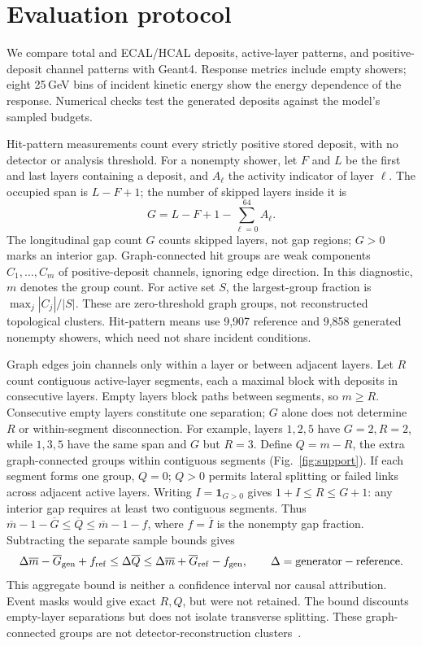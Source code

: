 \documentclass[10pt]{article}
\begin{document}
\section{Evaluation protocol}
\label{sec:diagnostics}

We compare total and ECAL/HCAL deposits, active-layer patterns, and positive-deposit channel patterns with Geant4. Response metrics include empty showers; eight 25\,GeV bins of incident kinetic energy show the energy dependence of the response. Numerical checks test the generated deposits against the model's sampled budgets.

Hit-pattern measurements count every strictly positive stored deposit, with no detector or analysis threshold. For a nonempty shower, let $F$ and $L$ be the first and last layers containing a deposit, and $A_\ell$ the activity indicator of layer $\ell$. The occupied span is $L-F+1$; the number of skipped layers inside it is
\begin{equation}
 G=L-F+1-\sum_{\ell=0}^{64}A_\ell.
 \label{eq:gaps}
\end{equation}
The longitudinal gap count $G$ counts skipped layers, not gap regions; $G>0$ marks an interior gap. Graph-connected hit groups are weak components $C_1,\ldots,C_m$ of positive-deposit channels, ignoring edge direction. In this diagnostic, $m$ denotes the group count. For active set $S$, the largest-group fraction is $\max_j|C_j|/|S|$. These are zero-threshold graph groups, not reconstructed topological clusters. Hit-pattern means use 9,907 reference and 9,858 generated nonempty showers, which need not share incident conditions.

Graph edges join channels only within a layer or between adjacent layers. Let $R$ count contiguous active-layer segments, each a maximal block with deposits in consecutive layers. Empty layers block paths between segments, so $m\geq R$. Consecutive empty layers constitute one separation; $G$ alone does not determine $R$ or within-segment disconnection. For example, layers $1,2,5$ have $G=2,R=2$, while $1,3,5$ have the same span and $G$ but $R=3$. Define $Q=m-R$, the extra graph-connected groups within contiguous segments (Fig.~\ref{fig:support}). If each segment forms one group, $Q=0$; $Q>0$ permits lateral splitting or failed links across adjacent active layers. Writing $I=\mathbf 1_{G>0}$ gives $1+I\leq R\leq G+1$: any interior gap requires at least two contiguous segments. Thus $\overline m-1-\overline G\leq\overline Q\leq\overline m-1-f$, where $f=\overline I$ is the nonempty gap fraction. Subtracting the separate sample bounds gives
\[
 \Delta\overline m-\overline G_{\rm gen}+f_{\rm ref}\leq\Delta\overline Q
 \leq\Delta\overline m+\overline G_{\rm ref}-f_{\rm gen},
 \qquad \Delta=\mathrm{generator}-\mathrm{reference}.
\]
This aggregate bound is neither a confidence interval nor causal attribution. Event masks would give exact $R,Q$, but were not retained. The bound discounts empty-layer separations but does not isolate transverse splitting. These graph-connected groups are not detector-reconstruction clusters~\cite{atlastopocluster}.
\end{document}
